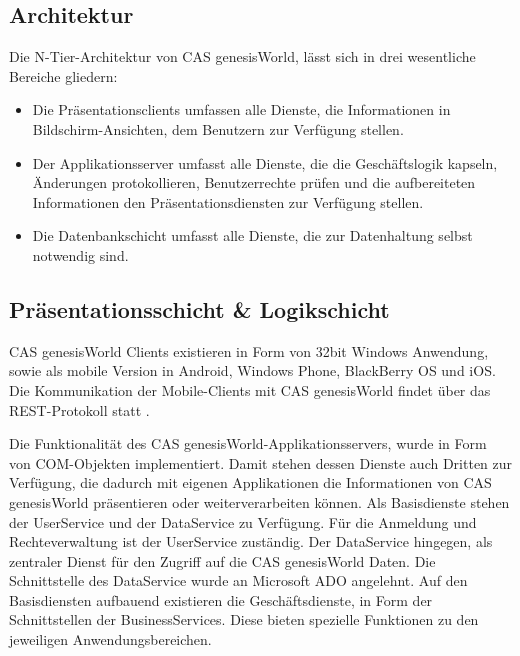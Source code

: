 \subsection{Architektur}

Die N-Tier-Architektur von CAS genesisWorld, lässt sich in drei wesentliche Bereiche gliedern:

\begin{itemize}
	\item Die Präsentationsclients umfassen alle Dienste, die Informationen in Bildschirm-Ansichten, dem Benutzern zur Verfügung stellen.
	\item Der Applikationsserver umfasst alle Dienste, die die Geschäftslogik kapseln, Änderungen protokollieren, Benutzerrechte prüfen und die aufbereiteten Informationen den Präsentationsdiensten zur Verfügung stellen.
	\item Die Datenbankschicht umfasst alle Dienste, die zur Datenhaltung selbst notwendig sind.
\end{itemize}


\subsection{Präsentationsschicht \& Logikschicht}

CAS genesisWorld Clients existieren in Form von 32bit Windows Anwendung, sowie als mobile Version in Android, Windows Phone, BlackBerry OS und iOS. Die Kommunikation der Mobile-Clients mit CAS genesisWorld findet über das REST-Protokoll statt \cite{cas2013a}.

Die Funktionalität des CAS genesisWorld-Applikationsservers, wurde in Form von COM-Objekten implementiert. Damit stehen dessen Dienste auch Dritten zur Verfügung, die dadurch mit eigenen Applikationen die Informationen von CAS genesisWorld präsentieren oder weiterverarbeiten können. Als Basisdienste stehen der UserService und der DataService zu Verfügung. Für die Anmeldung und Rechteverwaltung ist der UserService zuständig. Der DataService hingegen, als zentraler Dienst für den Zugriff auf die CAS genesisWorld Daten. Die Schnittstelle des DataService wurde an Microsoft ADO angelehnt. Auf den Basisdiensten aufbauend existieren die Geschäftsdienste, in Form der Schnittstellen der BusinessServices. Diese bieten spezielle Funktionen zu den jeweiligen Anwendungsbereichen.

